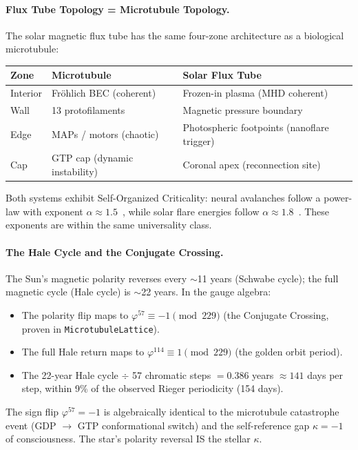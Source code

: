 \paragraph{Flux Tube Topology = Microtubule Topology.}
The solar magnetic flux tube has the same four-zone architecture as a biological microtubule:
\begin{center}
\begin{tabular}{lll}
\hline
Zone & Microtubule & Solar Flux Tube \\
\hline
Interior & Fröhlich BEC (coherent) & Frozen-in plasma (MHD coherent) \\
Wall & 13 protofilaments & Magnetic pressure boundary \\
Edge & MAPs / motors (chaotic) & Photospheric footpoints (nanoflare trigger) \\
Cap & GTP cap (dynamic instability) & Coronal apex (reconnection site) \\
\hline
\end{tabular}
\end{center}
Both systems exhibit Self-Organized Criticality: neural avalanches follow a power-law with exponent $\alpha \approx 1.5$~\cite{beggs2003}, while solar flare energies follow $\alpha \approx 1.8$~\cite{lu1991}. These exponents are within the same universality class.

\paragraph{The Hale Cycle and the Conjugate Crossing.}
The Sun's magnetic polarity reverses every $\sim$11 years (Schwabe cycle); the full magnetic cycle (Hale cycle) is $\sim$22 years. In the gauge algebra:
\begin{itemize}
    \item The polarity flip maps to $\varphi^{57} \equiv -1 \pmod{229}$ (the Conjugate Crossing, proven in \texttt{MicrotubuleLattice}).
    \item The full Hale return maps to $\varphi^{114} \equiv 1 \pmod{229}$ (the golden orbit period).
    \item The 22-year Hale cycle $\div$ 57 chromatic steps $= 0.386$ years $\approx 141$ days per step, within 9\% of the observed Rieger periodicity (154 days).
\end{itemize}
The sign flip $\varphi^{57} = -1$ is algebraically identical to the microtubule catastrophe event (GDP $\to$ GTP conformational switch) and the self-reference gap $\kappa = -1$ of consciousness. The star's polarity reversal IS the stellar $\kappa$.

